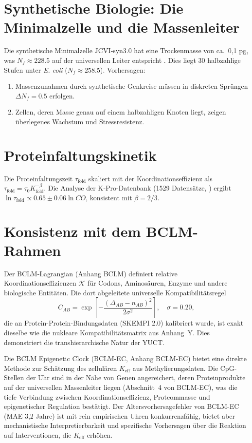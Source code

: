 \documentclass[11pt,a4paper]{article}
\newcommand{\REL}{\mathcal{K}}
\begin{document}
	\section{Synthetische Biologie: Die Minimalzelle und die Massenleiter}
	
	Die synthetische Minimalzelle JCVI‑syn3.0 hat eine Trockenmasse von ca.\ 0,1 pg, was \(N_f \approx 228.5\) auf der universellen Leiter entspricht \cite{Hutchison2016, Pelletier2023}. Dies liegt 30 halbzahlige Stufen unter \textit{E. coli} (\(N_f \approx 258.5\)). Vorhersagen:
	\begin{enumerate}
		\item Massenzunahmen durch synthetische Genkreise müssen in diskreten Sprüngen \(\Delta N_f = 0.5\) erfolgen.
		\item Zellen, deren Masse genau auf einem halbzahligen Knoten liegt, zeigen überlegenes Wachstum und Stressresistenz.
	\end{enumerate}
	
	\section{Proteinfaltungskinetik}
	
	Die Proteinfaltungszeit \(\tau_{\text{fold}}\) skaliert mit der Koordinationseffizienz als \(\tau_{\text{fold}} = \tau_0 K_{\text{fold}}^{-\beta}\). Die Analyse der K‑Pro-Datenbank (1529 Datensätze, \cite{Turina2023}) ergibt \(\ln \tau_{\text{fold}} \propto 0.65 \pm 0.06 \ln CO\), konsistent mit \(\beta=2/3\).
	
	\section{Konsistenz mit dem BCLM-Rahmen}
	
	Der BCLM-Lagrangian (Anhang BCLM) definiert relative Koordinationseffizienzen \(\REL\) für Codons, Aminosäuren, Enzyme und andere biologische Entitäten. Die dort abgeleitete universelle Kompatibilitätsregel
	\[
	C_{AB} = \exp\!\left[-\frac{(\Delta_{AB}-n_{AB})^2}{2\sigma^2}\right],\quad \sigma=0.20,
	\]
	die an Protein-Protein-Bindungsdaten (SKEMPI 2.0) kalibriert wurde, ist exakt dieselbe wie die nukleare Kompatibilitätsmatrix aus Anhang~Y. Dies demonstriert die transhierarchische Natur der YUCT.
	
	Die BCLM Epigenetic Clock (BCLM-EC, Anhang BCLM-EC) bietet eine direkte Methode zur Schätzung des zellulären \(K_{\mathrm{eff}}\) aus Methylierungsdaten. Die CpG-Stellen der Uhr sind in der Nähe von Genen angereichert, deren Proteinprodukte auf der universellen Massenleiter liegen (Abschnitt~4 von BCLM-EC), was die tiefe Verbindung zwischen Koordinationseffizienz, Proteommasse und epigenetischer Regulation bestätigt. Der Altersvorhersagefehler von BCLM-EC (MAE 3,2 Jahre) ist mit rein empirischen Uhren konkurrenzfähig, bietet aber mechanistische Interpretierbarkeit und spezifische Vorhersagen über die Reaktion auf Interventionen, die \(K_{\mathrm{eff}}\) erhöhen.
	
\end{document}
